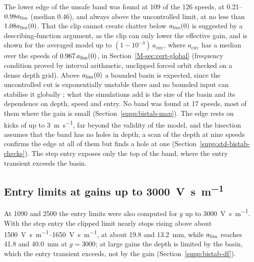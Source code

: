 The lower edge of the unsafe band was found at 109 of the 126 speeds, at 0.21--$0.98a_{\lim}$ (median 0.46), and always above the uncontrolled limit, at no less than $1.08a_{\lim}(0)$. That the clip cannot create chatter below $a_{\lim}(0)$ is suggested by a describing-function argument, as the clip can only lower the effective gain, and is shown for the averaged model up to $(1-10^{-3})\,a_{\mathrm{circ}}$, where $a_{\mathrm{circ}}$ has a median over the speeds of $0.967\,a_{\lim}(0)$, in Section~\ref{M-sec:cert-global} (frequency condition proved by interval arithmetic, unclipped forced orbit checked on a dense depth grid). Above $a_{\lim}(0)$ a bounded basin is expected, since the uncontrolled cut is exponentially unstable there and no bounded input can stabilise it globally \citep{hu2001book}; what the simulations add is the size of the basin and its dependence on depth, speed and entry. No band was found at 17 speeds, most of them where the gain is small (Section~\ref{supp:bistab-map}). The edge rests on kicks of up to \SI{3}{\metre\per\second}, far beyond the validity of the model, and the bisection assumes that the band has no holes in depth; a scan of the depth at nine speeds confirms the edge at all of them but finds a hole at one (Section~\ref{supp:std-bistab-checks}). The step entry exposes only the top of the band, where the entry transient exceeds the basin.

\subsection{Entry limits at gains up to \SI{3000}{\volt\second\per\metre}}\label{supp:std-bistab-gain}

At 1090 and \SI{2500}{\rpm} the entry limits were also computed for $g$ up to \SI{3000}{\volt\second\per\metre}. With the step entry the clipped limit nearly stops rising above about \SIrange{1500}{1650}{\volt\second\per\metre}, at about 19.8 and \SI{13.2}{\milli\metre}, while $a_{\lim}$ reaches 41.8 and \SI{40.0}{\milli\metre} at $g=3000$; at large gains the depth is limited by the basin, which the entry transient exceeds, not by the gain (Section~\ref{supp:bistab-df}).

